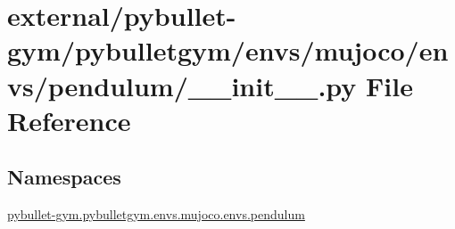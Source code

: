 \hypertarget{external_2pybullet-gym_2pybulletgym_2envs_2mujoco_2envs_2pendulum_2____init_____8py}{}\section{external/pybullet-\/gym/pybulletgym/envs/mujoco/envs/pendulum/\+\_\+\+\_\+init\+\_\+\+\_\+.py File Reference}
\label{external_2pybullet-gym_2pybulletgym_2envs_2mujoco_2envs_2pendulum_2____init_____8py}
\subsection*{Namespaces}
\begin{DoxyCompactItemize}
\item 
 \hyperlink{namespacepybullet-gym_1_1pybulletgym_1_1envs_1_1mujoco_1_1envs_1_1pendulum}{pybullet-\/gym.\+pybulletgym.\+envs.\+mujoco.\+envs.\+pendulum}
\end{DoxyCompactItemize}
